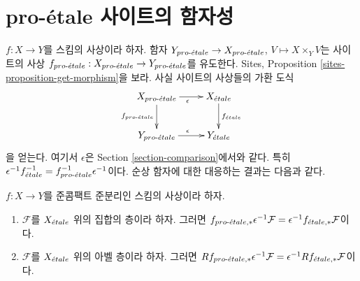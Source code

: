 \section{pro-\'etale 사이트의 함자성}
\label{section-morphism}

\noindent
$f : X \to Y$를 스킴의 사상이라 하자. 함자
$Y_{pro\text{-}\acute{e}tale} \to X_{pro\text{-}\acute{e}tale}$, $V \mapsto X \times_Y V$는 사이트의
사상 $f_{pro\text{-}\acute{e}tale} : X_{pro\text{-}\acute{e}tale} \to Y_{pro\text{-}\acute{e}tale}$를 유도한다.
Sites, Proposition \ref{sites-proposition-get-morphism}을 보라. 사실
사이트의 사상들의 가환 도식
$$
\xymatrix{
X_\proetale \ar[r]_\epsilon \ar[d]_{f_\proetale} &
X_\etale \ar[d]^{f_\etale} \\
Y_\proetale \ar[r]^\epsilon & Y_\etale
}
$$
을 얻는다. 여기서 $\epsilon$은 Section \ref{section-comparison}에서와
같다. 특히
$\epsilon^{-1} f_{\acute{e}tale}^{-1} = f_{pro\text{-}\acute{e}tale}^{-1} \epsilon^{-1}$이다.
순상 함자에 대한 대응하는 결과는 다음과 같다.

\begin{lemma}
\label{lemma-morphism-comparison}
$f : X \to Y$를 준콤팩트 준분리인 스킴의 사상이라 하자.
\begin{enumerate}
\item $\mathcal{F}$를 $X_{\acute{e}tale}$ 위의 집합의 층이라 하자. 그러면
$f_{{pro\text{-}\acute{e}tale}, *}\epsilon^{-1}\mathcal{F} =
\epsilon^{-1}f_{{\acute{e}tale}, *}\mathcal{F}$이다.
\item $\mathcal{F}$를 $X_{\acute{e}tale}$ 위의 아벨 층이라 하자. 그러면
$Rf_{{pro\text{-}\acute{e}tale}, *}\epsilon^{-1}\mathcal{F} =
\epsilon^{-1}Rf_{{\acute{e}tale}, *}\mathcal{F}$이다.
\end{enumerate}
\end{lemma}

